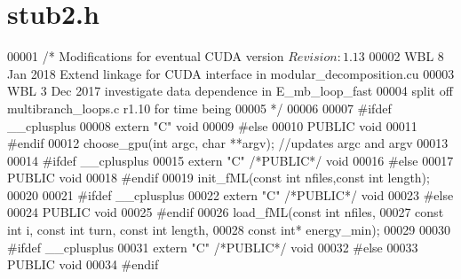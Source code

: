 \hypertarget{stub2_8h_source}{}\section{stub2.\+h}
\label{stub2_8h_source}

\begin{DoxyCode}
00001 \textcolor{comment}{/* Modifications for eventual CUDA version $Revision: 1.13 $}
00002 \textcolor{comment}{WBL  8 Jan 2018 Extend linkage for CUDA interface in modular\_decomposition.cu}
00003 \textcolor{comment}{WBL  3 Dec 2017 investigate data dependence in E\_mb\_loop\_fast}
00004 \textcolor{comment}{  split off multibranch\_loops.c r1.10 for time being}
00005 \textcolor{comment}{*/}
00006 
00007 \textcolor{preprocessor}{#ifdef \_\_cplusplus}
00008 \textcolor{keyword}{extern} \textcolor{stringliteral}{"C"} \textcolor{keywordtype}{void}
00009 \textcolor{preprocessor}{#else}
00010 PUBLIC \textcolor{keywordtype}{void}
00011 \textcolor{preprocessor}{#endif}
00012 choose\_gpu(\textcolor{keywordtype}{int} argc, \textcolor{keywordtype}{char} **argv); \textcolor{comment}{//updates argc and argv}
00013 
00014 \textcolor{preprocessor}{#ifdef \_\_cplusplus}
00015 \textcolor{keyword}{extern} \textcolor{stringliteral}{"C"} \textcolor{comment}{/*PUBLIC*/} \textcolor{keywordtype}{void}
00016 \textcolor{preprocessor}{#else}
00017 PUBLIC \textcolor{keywordtype}{void}
00018 \textcolor{preprocessor}{#endif}
00019 init\_fML(\textcolor{keyword}{const} \textcolor{keywordtype}{int} nfiles,\textcolor{keyword}{const} \textcolor{keywordtype}{int} length);
00020 
00021 \textcolor{preprocessor}{#ifdef \_\_cplusplus}
00022 \textcolor{keyword}{extern} \textcolor{stringliteral}{"C"} \textcolor{comment}{/*PUBLIC*/} \textcolor{keywordtype}{void}
00023 \textcolor{preprocessor}{#else}
00024 PUBLIC \textcolor{keywordtype}{void}
00025 \textcolor{preprocessor}{#endif}
00026 load\_fML(\textcolor{keyword}{const} \textcolor{keywordtype}{int} nfiles,
00027    \textcolor{keyword}{const} \textcolor{keywordtype}{int} i, \textcolor{keyword}{const} \textcolor{keywordtype}{int} turn, \textcolor{keyword}{const} \textcolor{keywordtype}{int} length,
00028    \textcolor{keyword}{const} \textcolor{keywordtype}{int}* energy\_min);
00029 
00030 \textcolor{preprocessor}{#ifdef \_\_cplusplus}
00031 \textcolor{keyword}{extern} \textcolor{stringliteral}{"C"} \textcolor{comment}{/*PUBLIC*/} \textcolor{keywordtype}{void}
00032 \textcolor{preprocessor}{#else}
00033 PUBLIC \textcolor{keywordtype}{void}
00034 \textcolor{preprocessor}{#endif}

\end{DoxyCode}
